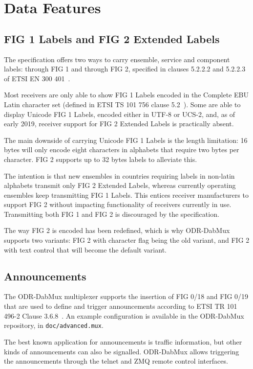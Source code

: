 \section{Data Features}
\subsection{FIG 1 Labels and FIG 2 Extended Labels}
The specification offers two ways to carry ensemble, service and component
labels: through FIG 1 and through FIG 2, specified in clauses 5.2.2.2 and 5.2.2.3
of ETSI EN 300 401~\cite{etsidab}.

Most receivers are only able to show FIG 1 Labels encoded in the Complete EBU
Latin character set (defined in ETSI TS 101 756 clause
5.2~\cite{etsidabtables}). Some are able to display Unicode FIG 1 Labels,
encoded either in UTF-8 or UCS-2, and, as of early 2019, receiver support for
FIG 2 Extended Labels is practically absent.

The main downside of carrying Unicode FIG 1 Labels is the length limitation: 16
bytes will only encode eight characters in alphabets that require two bytes per
character. FIG 2 supports up to 32 bytes labels to alleviate this.

The intention is that new ensembles in countries requiring labels in non-latin
alphabets transmit only FIG 2 Extended Labels, whereas currently operating
ensembles keep transmitting FIG 1 Labels. This entices receiver manufacturers to
support FIG 2 without impacting functionality of receivers currently in use.
Transmitting both FIG 1 and FIG 2 is discouraged by the specification.

The way FIG 2 is encoded has been redefined, which is why ODR-DabMux supports
two variants: FIG 2 with character flag being the old variant, and FIG 2 with
text control that will become the default variant.

\subsection{Announcements}
The ODR-DabMux multiplexer supports the insertion of FIG 0/18 and FIG 0/19 that
are used to define and trigger announcements according to ETSI TR 101 496-2
Clause 3.6.8~\cite{etsitr1014962}.
An example configuration is available in the ODR-DabMux repository, in
\texttt{doc/advanced.mux}.

The best known application for announcements is traffic information, but other
kinds of announcements can also be signalled. ODR-DabMux allows triggering the
announcements through the telnet and ZMQ remote control interfaces.


